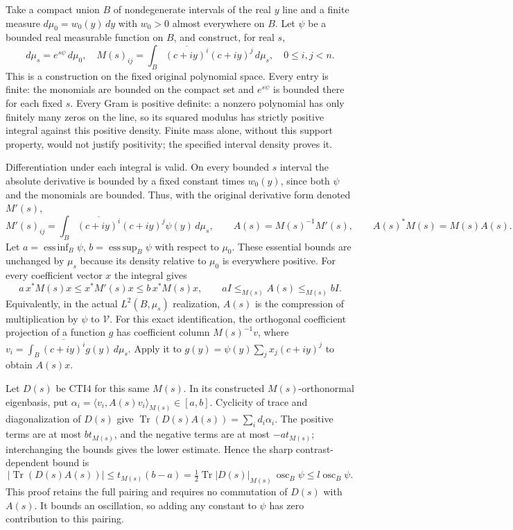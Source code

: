 Take a compact union $B$ of nondegenerate intervals of the real
$y$ line and a finite measure $d\mu_0=w_0(y)\,dy$ with
$w_0>0$ almost everywhere on $B$. Let $\psi$ be a bounded real
measurable function on $B$, and construct, for real $s$,
\[
 d\mu_s=e^{s\psi}\,d\mu_0,\quad
 M(s)_{ij}=\int_B\overline{(c+iy)^i}(c+iy)^j\,d\mu_s,
 \quad 0\leq i,j<n.
 \tag{CTI10}
\]
This is a construction on the fixed original polynomial space.
Every entry is finite: the monomials are bounded on the compact
set and $e^{s\psi}$ is bounded there for each fixed $s$.
Every Gram is positive definite: a nonzero polynomial has only
finitely many zeros on the line, so its squared modulus has
strictly positive integral against this positive density.
Finite mass alone, without this support property, would not
justify positivity; the specified interval density proves it.

Differentiation under each integral is valid. On every bounded
$s$ interval the absolute derivative is bounded by a fixed constant
times $w_0(y)$, since both $\psi$ and the monomials are bounded.
Thus, with the original derivative form denoted $M'(s)$,
\[
 M'(s)_{ij}=\int_B\overline{(c+iy)^i}(c+iy)^j\psi(y)\,d\mu_s,
 \qquad A(s)=M(s)^{-1}M'(s),\qquad A(s)^*M(s)=M(s)A(s).
 \tag{CTI11}
\]
Let $a=\operatorname*{ess\,inf}_B\psi$,
$b=\operatorname*{ess\,sup}_B\psi$ with respect to $\mu_0$.
These essential bounds are unchanged by $\mu_s$ because its
density relative to $\mu_0$ is everywhere positive. For every
coefficient vector $x$ the integral gives
\[
 a\,x^*M(s)x\leq x^*M'(s)x\leq b\,x^*M(s)x,
 \qquad aI\leq_{M(s)}A(s)\leq_{M(s)}bI.
 \tag{CTI12}
\]
Equivalently, in the actual $L^2(B,\mu_s)$ realization, $A(s)$
is the compression of multiplication by $\psi$ to $\mathcal V$.
For this exact identification, the orthogonal coefficient projection
of a function $g$ has coefficient column $M(s)^{-1}v$, where
$v_i=\int_B\overline{(c+iy)^i}g(y)\,d\mu_s$. Apply it to
$g(y)=\psi(y)\sum_jx_j(c+iy)^j$ to obtain $A(s)x$.

Let $D(s)$ be CTI4 for this same $M(s)$. In its constructed
$M(s)$-orthonormal eigenbasis, put
$\alpha_i=\langle v_i,A(s)v_i\rangle_{M(s)}\in[a,b]$.
Cyclicity of trace and diagonalization of $D(s)$ give
$\operatorname{Tr}(D(s)A(s))=\sum_i d_i\alpha_i$.
The positive terms are at most $bt_{M(s)}$, and the negative
terms are at most $-at_{M(s)}$; interchanging the bounds gives
the lower estimate. Hence the sharp contrast-dependent bound is
\[
 \left|\operatorname{Tr}(D(s)A(s))\right|
 \leq t_{M(s)}(b-a)
 =\tfrac12\operatorname{Tr}|D(s)|_{M(s)}\,\operatorname{osc}_B\psi
 \leq l\operatorname{osc}_B\psi.
 \tag{CTI13}
\]
This proof retains the full pairing and requires no commutation
of $D(s)$ with $A(s)$. It bounds an oscillation, so adding any
constant to $\psi$ has zero contribution to this pairing.


